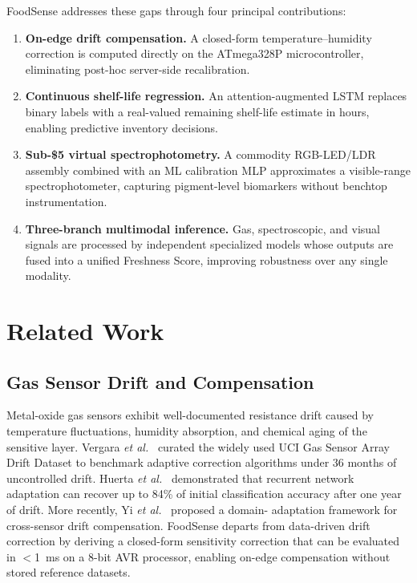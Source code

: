 \documentclass[conference]{IEEEtran}
\begin{document}
FoodSense addresses these gaps through four principal contributions:
\begin{enumerate}
  \item \textbf{On-edge drift compensation.} A closed-form temperature--humidity
        correction is computed directly on the ATmega328P microcontroller,
        eliminating post-hoc server-side recalibration.
  \item \textbf{Continuous shelf-life regression.} An attention-augmented LSTM
        replaces binary labels with a real-valued remaining shelf-life
        estimate in hours, enabling predictive inventory decisions.
  \item \textbf{Sub-\$5 virtual spectrophotometry.} A commodity RGB-LED/LDR
        assembly combined with an ML calibration MLP approximates a
        visible-range spectrophotometer, capturing pigment-level biomarkers
        without benchtop instrumentation.
  \item \textbf{Three-branch multimodal inference.} Gas, spectroscopic, and
        visual signals are processed by independent specialized models
        whose outputs are fused into a unified Freshness Score, improving
        robustness over any single modality.
\end{enumerate}

\section{Related Work}
\label{sec:related}

\subsection{Gas Sensor Drift and Compensation}
Metal-oxide gas sensors exhibit well-documented resistance drift
caused by temperature fluctuations, humidity absorption, and chemical
aging of the sensitive layer. Vergara \textit{et al.}~\cite{Vergara2012}
curated the widely used UCI Gas Sensor Array Drift Dataset to
benchmark adaptive correction algorithms under 36 months of
uncontrolled drift. Huerta \textit{et al.}~\cite{Huerta2016}
demonstrated that recurrent network adaptation can recover up to 84\%
of initial classification accuracy after one year of drift.
More recently, Yi \textit{et al.}~\cite{Yi2022} proposed a domain-
adaptation framework for cross-sensor drift compensation. FoodSense
departs from data-driven drift correction by deriving a closed-form
sensitivity correction that can be evaluated in $<$1~ms on a
8-bit AVR processor, enabling on-edge compensation without stored
reference datasets.
\end{document}
